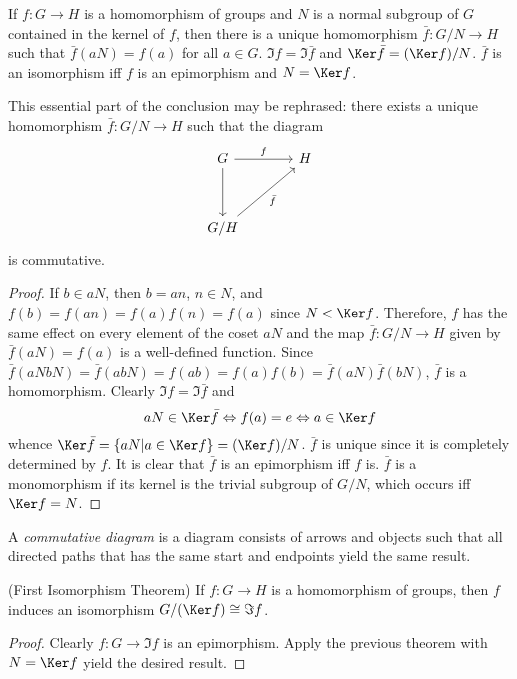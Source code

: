 \begin{Theorem}
	If $ f:G \to H $ is a homomorphism of groups and $ N $ is a normal subgroup of $ G $ contained in the kernel of $ f $, then there is a unique homomorphism $ \bar{f}:G/N \to H $ such that $ \bar{f}(aN)=f(a) $ for all $ a \in G $. $ \Im f = \Im \bar{f} $ and $ \Ker \bar{f}=(\Ker f)/N $. $ \bar{f} $ is an isomorphism iff $ f$ is an epimorphism and $ N = \Ker f$. 
\end{Theorem}
This essential part of the conclusion may be rephrased: there exists a unique homomorphism $ \bar{f}:G/N \to H $ such that the diagram
\begin{equation}
	\begin{tikzcd}[row sep=3.5em,column sep=3.5em]
	G \arrow[r,"f"] \arrow[d] & H \\
	G/H \arrow[ru,"\bar{f}"']
	\end{tikzcd} \nonumber
\end{equation}
is commutative.
\begin{proof}
	If $ b \in aN $, then $ b=an $, $ n \in N $, and $ f(b)=f(an)=f(a)f(n)=f(a) $ since $ N < \Ker f $. Therefore, $ f $ has the same effect on every element of the coset $ aN $ and the map $ \bar{f}:G/N \to H $ given by $ \bar{f}(aN)=f(a) $ is a well-defined function. Since $ \bar{f}(aNbN)=\bar{f}(abN)=f(ab)=f(a)f(b)=\bar{f}(aN)\bar{f}(bN) $, $ \bar{f} $ is a homomorphism. Clearly $ \Im f = \Im \bar{f} $ and
	\begin{equation}
		aN \in \Ker \bar{f} \Leftrightarrow f(a)=e \Leftrightarrow a \in \Ker f \nonumber
	\end{equation}
	whence $ \Ker \bar{f}=\{aN|a \in \Ker f \} = (\Ker f)/N $. $ \bar{f} $ is unique since it is completely determined by $ f $. It is clear that $ \bar{f} $ is an epimorphism iff $ f$ is. $ \bar{f}$ is a monomorphism if its kernel is the trivial subgroup of $ G/N $, which occurs iff $ \Ker f = N $.
\end{proof}
\begin{Definition}
	A \textit{commutative diagram} is a diagram consists of arrows and objects such that all directed paths that has the same start and endpoints yield the same result.
\end{Definition}
\begin{Corollary}(First Isomorphism Theorem)
	If $ f:G \to H $ is a homomorphism of groups, then $ f $ induces an isomorphism $ G/(\Ker f)\cong \Im f $.
\end{Corollary}
\begin{proof}
	Clearly $ f:G \to \Im f $ is an epimorphism. Apply the previous theorem with $ N=\Ker f $ yield the desired result.
\end{proof}
